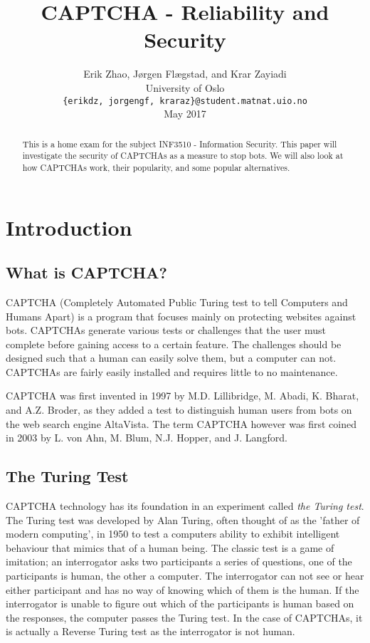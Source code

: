 \documentclass[a4paper]{IEEEtran}
\begin{document}
\title{CAPTCHA - Reliability and Security}

\author{Erik Zhao, Jørgen Flægstad, and Krar Zayiadi\\ University of Oslo\\ \texttt{\{erikdz, jorgengf, kraraz\}@student.matnat.uio.no}\\ \vspace{1cm}May 2017}

\maketitle


\begin{abstract}
This is a home exam for the subject INF3510 - Information Security. This paper will investigate the security of CAPTCHAs as a measure to stop bots. We will also look at how CAPTCHAs work, their popularity, and some popular alternatives.
\end{abstract}

\section{Introduction}

\subsection{What is CAPTCHA?}
CAPTCHA (Completely Automated Public Turing test to tell Computers and Humans Apart) is a program that focuses mainly on protecting websites against bots. CAPTCHAs generate various tests or challenges that the user must complete before gaining access to a certain feature. The challenges should be designed such that a human can easily solve them, but a computer can not. CAPTCHAs are fairly easily installed and requires little to no maintenance. 

CAPTCHA was first invented in 1997 by M.D. Lillibridge, M. Abadi, K. Bharat, and A.Z. Broder, as they added a test to distinguish human users from bots on the web search engine AltaVista\cite{first}. The term CAPTCHA however was first coined in 2003 by L. von Ahn, M. Blum, N.J. Hopper, and J. Langford\cite{term}.

\subsection{The Turing Test}
CAPTCHA technology has its foundation in an experiment called \textit{the Turing test}. The Turing test was developed by Alan Turing, often thought of as the 'father of modern computing', in 1950 to test a computers ability to exhibit intelligent behaviour that mimics that of a human being. The classic test is a game of imitation; an interrogator asks two participants a series of questions, one of the participants is human, the other a computer. The interrogator can not see or hear either participant and has no way of knowing which of them is the human. If the interrogator is unable to figure out which of the participants is human based on the responses, the computer passes the Turing test. In the case of CAPTCHAs, it is actually a Reverse Turing test as the interrogator is not human. 
\end{document}
